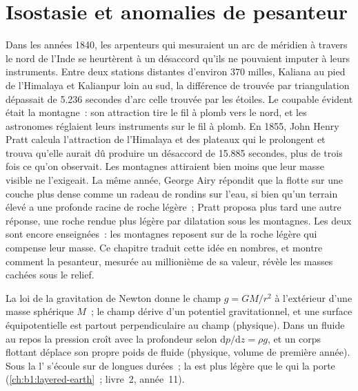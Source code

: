 \chapter{Isostasie et anomalies de pesanteur}\label{ch:b1:isostasy-gravity}

Dans les années 1840, les arpenteurs qui mesuraient un arc de méridien à travers
le nord de l'Inde se heurtèrent à un désaccord qu'ils ne pouvaient imputer à
leurs instruments. Entre deux stations distantes d'environ 370 milles, Kaliana au
pied de l'Himalaya et Kalianpur loin au sud, la différence de  trouvée par
triangulation dépassait de 5.236 secondes d'arc celle trouvée par les étoiles.
Le coupable évident était la montagne~: son attraction tire le fil à plomb vers
le nord, et les astronomes réglaient leurs instruments sur le fil à plomb. En 1855,
John Henry Pratt calcula l'attraction de l'Himalaya et des plateaux qui le
prolongent et trouva qu'elle aurait dû produire un désaccord de 15.885 secondes,
plus de trois fois ce qu'on observait. Les montagnes attiraient bien moins que leur
masse visible ne l'exigeait. La même année, George Airy répondit que la 
flotte sur une couche plus dense comme un radeau de rondins sur l'eau, si bien
qu'un terrain élevé a une profonde racine de roche légère~; Pratt proposa plus
tard une autre réponse, une roche rendue plus légère par dilatation sous les
montagnes. Les deux sont encore enseignées~: les montagnes reposent sur de la
roche légère qui compense leur masse. Ce chapitre traduit cette idée en
nombres, et montre comment la pesanteur, mesurée au millionième de sa valeur,
révèle les masses cachées sous le relief.

\begin{recall}
La loi de la gravitation de Newton donne le champ $g = GM/r^2$ à l'extérieur d'une
masse sphérique $M$~; le champ dérive d'un potentiel gravitationnel, et une
surface équipotentielle est partout perpendiculaire au champ (physique). Dans un
fluide au repos la pression croît avec la profondeur selon $\mathrm dp/\mathrm dz = \rho g$,
et un corps flottant déplace son propre poids de fluide (physique, volume de première
année). Sous la  l' s'écoule sur de longues durées~; la
 est plus légère que le  qui la porte (\cref{ch:b1:layered-earth}~;
livre~2, année~11).
\end{recall}

